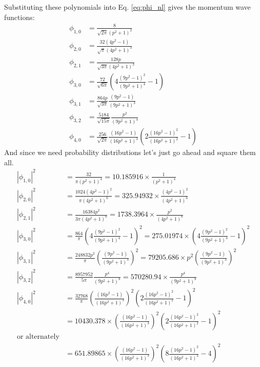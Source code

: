 \documentclass[12pt]{article}
\begin{document}
Substituting these polynomials into Eq. \ref{eq:phi_nl} gives the momentum wave functions:
\begin{align}
\phi_{1,0}&=\frac{8}{\sqrt{2\pi}(p^2+1)^2}\\
\phi_{2,0}&=\frac{32(4p^2-1)}{\sqrt{\pi}(4p^2+1)^3}\\
\phi_{2,1}&=\frac{128p}{\sqrt{3\pi}(4p^2+1)^3}\\
\phi_{3,0}&=\frac{72}{\sqrt{6\pi}}\left(4\frac{(9p^2-1)^2}{(9p^2+1)^4}-1\right)\\
\phi_{3,1}&=\frac{864p}{\sqrt{3\pi}}\frac{(9p^2-1)}{(9p^2+1)^3}\\
\phi_{3,2}&=\frac{5184}{\sqrt{15\pi}}\frac{p^2}{(9p^2+1)^4}\\
\phi_{4,0}&=\frac{256}{\sqrt{2\pi}}\frac{(16p^2-1)}{(16p^2+1)^3}\left(2\frac{(16p^2-1)^2}{(16p^2+1)^2}-1\right)
\end{align}
And since we need probability distributions let's just go ahead and square them all.
\begin{align}
\left|\phi_{1,0}\right|^2&=\frac{32}{\pi(p^2+1)^4}=10.185916\times\frac{1}{(p^2+1)^4}\\
\left|\phi_{2,0}\right|^2&=\frac{1024(4p^2-1)^2}{\pi(4p^2+1)^6}=325.94932\times\frac{(4p^2-1)^2}{(4p^2+1)^6}\\
\left|\phi_{2,1}\right|^2&=\frac{16384p^2}{3\pi(4p^2+1)^6}=1738.3964\times\frac{p^2}{(4p^2+1)^6}\\
\left|\phi_{3,0}\right|^2&=\frac{864}{\pi}\left(4\frac{(9p^2-1)^2}{(9p^2+1)^4}-1\right)^2=275.01974\times\left(4\frac{(9p^2-1)^2}{(9p^2+1)^4}-1\right)^2\\
\left|\phi_{3,1}\right|^2&=\frac{248832p^2}{\pi}\left(\frac{(9p^2-1)}{(9p^2+1)^3}\right)^2=79205.686\times p^2\left(\frac{(9p^2-1)}{(9p^2+1)^3}\right)^2\\
\left|\phi_{3,2}\right|^2&=\frac{8957952}{5\pi}\frac{p^4}{(9p^2+1)^8}=570280.94\times\frac{p^4}{(9p^2+1)^8}\\
\left|\phi_{4,0}\right|^2&=\frac{32768}{\pi}\left(\frac{(16p^2-1)}{(16p^2+1)^3}\right)^2\left(2\frac{(16p^2-1)^2}{(16p^2+1)^2}-1\right)^2\\~&=10430.378\times\left(\frac{(16p^2-1)}{(16p^2+1)^3}\right)^2\left(2\frac{(16p^2-1)^2}{(16p^2+1)^2}-1\right)^2\\\textrm{or alternately}\\
~&=651.89865\times\left(\frac{(16p^2-1)}{(16p^2+1)^3}\right)^2\left(8\frac{(16p^2-1)^2}{(16p^2+1)^2}-4\right)^2
\end{align}

%


\end{document}
